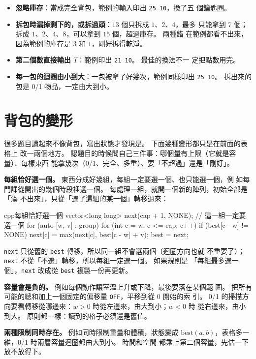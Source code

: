 \begin{itemize}
\item \textbf{忽略庫存}：當成完全背包，範例的輸入印出 \texttt{25 10}，換了五
個鑰匙圈。
\item \textbf{拆包時漏掉剩下的，或拆過頭}：$13$ 個只拆成 $1$、$2$、$4$，最多
只能拿到 $7$ 個；拆成 $1$、$2$、$4$、$8$，可以拿到 $15$ 個，超過庫存。 兩種錯
在範例都看不出來，因為範例的庫存是 $3$ 和 $1$，剛好拆得乾淨。
\item \textbf{第二個數直接輸出 $T$}：範例印出 \texttt{21 10}。 最佳的換法不一
定把點數用完。
\item \textbf{每一包的迴圈由小到大}：一包被拿了好幾次，範例同樣印出
\texttt{25 10}。 拆出來的包是 0/1 物品，一定由大到小。
\end{itemize}

\section{背包的變形}
\label{sec:knap-variants}

很多題目讀起來不像背包，寫出狀態才發現是。 下面幾種變形都只是在前面的表格上
改一兩個地方。 認題目的時候問自己三件事：哪個量有上限（它就是容量）、每樣東西
能拿幾次（0/1、完全、多重）、要「不超過」還是「剛好」。

\textbf{每組恰好選一個。} 東西分成好幾組，每組一定要選一個、也只能選一個，例
如每門課從開出的幾個時段裡選一個。 每處理一組，就開一個新的陣列，初始全部是「湊
不出來」，只從「選了這組的某一個」轉移過來：

\begin{code}{cpp}{每組恰好選一個}
vector<long long> next(cap + 1, NONE);         // 這一組一定要選一個
for (auto [w, v] : group) {
    for (int c = w; c <= cap; c++) {
        if (best[c - w] != NONE) {
            next[c] = max(next[c], best[c - w] + v);
        }
    }
}
best = next;
\end{code}

\texttt{next} 只從舊的 \texttt{best} 轉移，所以同一組不會選兩個（迴圈方向也就
不重要了）；\texttt{next} 不從「不選」轉移，所以每組一定選一個。 如果規則是
「每組最多選一個」，\texttt{next} 改成從 \texttt{best} 複製一份再更新。

\textbf{容量會是負的。} 例如每個動作讓室溫上升或下降，最後要落在某個範
圍。 把所有可能的總和加上一個固定的偏移量 \texttt{OFF}，平移到從 $0$ 開始的索
引。 0/1 的掃描方向要看轉移從哪邊來：$w > 0$ 時從左邊來，由大到小；$w < 0$ 時
從右邊來，由小到大。 原則都一樣：讀到的格子必須還是舊值。

\textbf{兩種限制同時存在。} 例如同時限制重量和體積，狀態變成
$\mathrm{best}(a, b)$，表格多一維，0/1 時兩層容量迴圈都由大到小。 時間和空間
都乘上第二個容量，先估一下放不放得下。

